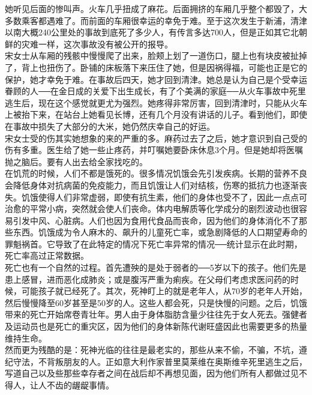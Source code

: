 她听见后面的惨叫声。火车几乎扭成了麻花。后面拥挤的车厢几乎整个都毁了，大多数乘客都遇难了。而前面的车厢很幸运的幸免于难。至于这次发生于新浦，清津以南大概240公里处的事故到底死了多少人，有传言多达700人，但是正如其它北朝鲜的灾难一样，这次事故没有被公开的报导。\\

宋女士从车厢的残骸中慢慢爬了出来，脸颊上划了一道伤口，腿上也有块皮被扯掉了，背上也扭伤了。卧铺的床板落下来压住了她，但是因祸得福，可能也正是它的保护，她才幸免于难。在事故后四天，她才回到清津。她总是认为自己是个受幸运眷顾的人──在金日成的关爱下出生成长，有了个美满的家庭──从火车事故中死里逃生后，现在这个感觉就更尤为强烈。她疼得非常厉害，回到清津时，只能从火车上被抬下来，在站台上她看见长博，还有几个月没有讲话的儿子。看到他们，即使在事故中损失了大部分的大米，她仍然庆幸自己的好运。\\

宋女士受的伤其实她想象的来的严重的多。麻药过去了之后，她才意识到自己受的伤有多重。医生给了她一些止疼药，并叮嘱她要卧床休息3个月。但是她却将医嘱抛之脑后。要有人出去给全家找吃的。\\

在饥荒的时候，人们不都是饿死的。很多情况饥饿会先引发疾病。长期的营养不良会降低身体对抗病菌的免疫能力，而且饥饿让人们对结核，伤寒的抵抗力也逐渐丧失。饥饿使得人们非常虚弱，即使有抗生素，他们的身体也受不了，因此一点点可治愈的平常小病，突然就会使人们丧命。体内电解质等化学成分的剧烈波动也很容易引发中风、心脏病。人们也因为食用代食品而丧命，因为他们的身体消化不了那些东西。饥饿成为令人麻木的、飙升的儿童死亡率，或急剧降低的人口期望寿命的罪魁祸首。它导致了在此特定的情况下死亡率异常的情况──统计显示在此时期，死亡率高过正常数据。\\

死亡也有一个自然的过程。首先遭殃的是处于弱者的──5岁以下的孩子。他们先是患上感冒，进而恶化成肺炎；或是腹泻严重为痢疾。在父母们考虑求医问药的时候，可能孩子就已经死了。其次，死神盯上的就是老年人，从70岁的老年人开始，然后慢慢降至60岁甚至是50岁的人。这些人都会死，只是快慢的问题。之后，饥饿带来的死亡开始席卷青壮年。男人由于身体脂肪含量少往往先于女人死去。强健者及运动员也是死亡的重灾区，因为他们的身体新陈代谢旺盛因此也需要更多的热量维持生命。\\

然而更为残酷的是：死神光临的往往是最老实的，那些从来不偷，不骗，不坑，遵纪守法，不背叛朋友的人。正如意大利作家普里莫莱维在奥斯维辛死里逃生之后，写道自己以及些那些幸存者之间在战后却不再想见面，因为他们所有人都做过见不得人，让人不齿的龌龊事情。\\

